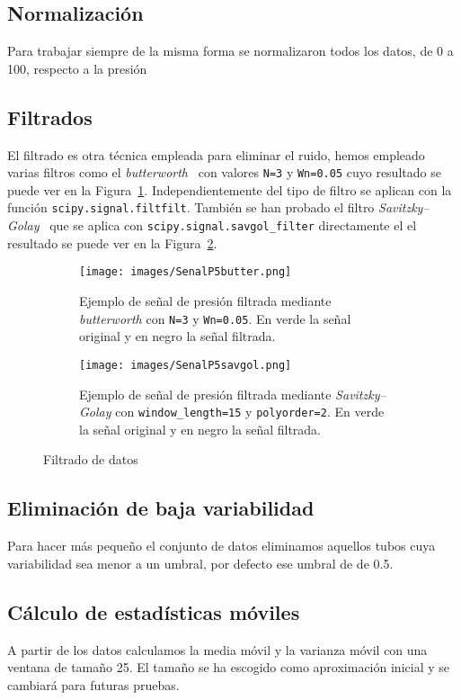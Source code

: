 \documentclass[a4paper,12pt,twoside,oldfontcommands]{memoir}
\begin{document}
	\subsection{Normalización}
	Para trabajar siempre de la misma forma se normalizaron todos los datos, de 0 a 100, respecto a la presión
	\subsection{Filtrados}
	El filtrado es otra técnica empleada para eliminar el ruido, hemos empleado varias filtros como el \textit{butterworth}~\cite{wiki:butter} con valores \texttt{N=3} y \texttt{Wn=0.05} cuyo resultado se puede ver en la Figura~\ref{fig:senalP5butter}. Independientemente del tipo de filtro se aplican con la función \texttt{scipy.signal.filtfilt}. También se han probado el filtro \textit{Savitzky–Golay}~\cite{wiki:savgol} que se aplica con \texttt{scipy.signal.savgol\_filter} directamente el el resultado se puede ver en la Figura~\ref{fig:senalP5savgol}.
	\begin{figure}
		\centering
		\begin{subfigure}[b]{\textwidth}
			\texttt{[image: images/SenalP5butter.png]}
			\caption{Ejemplo de señal de presión filtrada mediante \textit{butterworth} con \texttt{N=3} y \texttt{Wn=0.05}. En verde la señal original y en negro la señal filtrada.}
			\label{fig:senalP5butter}
		\end{subfigure}
		\begin{subfigure}[b]{\textwidth}
			\texttt{[image: images/SenalP5savgol.png]}
			\caption{Ejemplo de señal de presión filtrada mediante \textit{Savitzky–Golay} con \texttt{window\_length=15} y \texttt{polyorder=2}. En verde la señal original y en negro la señal filtrada.}
			\label{fig:senalP5savgol}
		\end{subfigure}
		\caption{Filtrado de datos}
		\label{fig:filters}
	\end{figure}
	
	\subsection{Eliminación de baja variabilidad}
	Para hacer más pequeño el conjunto de datos eliminamos aquellos tubos cuya variabilidad sea menor a un umbral, por defecto ese umbral de de 0.5.
	\subsection{Cálculo de estadísticas móviles}
	A partir de los datos calculamos la media móvil y la varianza móvil con una ventana de tamaño 25. El tamaño se ha escogido como aproximación inicial y se cambiará para futuras pruebas. 
	
\end{document}
